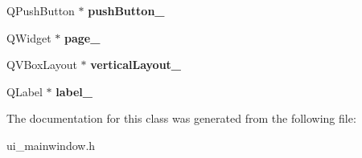 \begin{DoxyCompactItemize}
\item 
\hypertarget{class_ui___main_window_a59a7d8124bce933d63f53f2153d447b4}{Q\-Push\-Button $\ast$ {\bfseries push\-Button\-\_}}\label{class_ui___main_window_a59a7d8124bce933d63f53f2153d447b4}

\item 
\hypertarget{class_ui___main_window_ac682cb2a9b686ca7c3d29771ad9ccb48}{Q\-Widget $\ast$ {\bfseries page\-\_}}\label{class_ui___main_window_ac682cb2a9b686ca7c3d29771ad9ccb48}

\item 
\hypertarget{class_ui___main_window_afcc20a3d5058037a00cdc6122f231848}{Q\-V\-Box\-Layout $\ast$ {\bfseries vertical\-Layout\-\_}}\label{class_ui___main_window_afcc20a3d5058037a00cdc6122f231848}

\item 
\hypertarget{class_ui___main_window_a2e2516d755e4dd53fc905dabddf2738a}{Q\-Label $\ast$ {\bfseries label\-\_}}\label{class_ui___main_window_a2e2516d755e4dd53fc905dabddf2738a}

\end{DoxyCompactItemize}


The documentation for this class was generated from the following file\-:\begin{DoxyCompactItemize}
\item 
ui\-\_\-mainwindow.\-h\end{DoxyCompactItemize}

